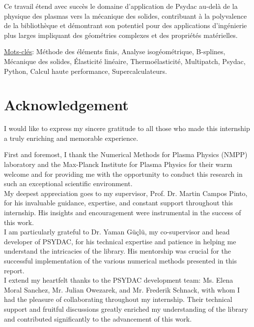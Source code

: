 \documentclass[a4paper,12pt,twoside]{report}
\begin{document}
Ce travail étend avec succès le domaine d'application de Psydac au-delà de la physique des plasmas vers la mécanique des solides, contribuant à la polyvalence de la bibliothèque et démontrant son potentiel pour des applications d'ingénierie plus larges impliquant des géométries complexes et des propriétés matérielles.

\vspace{0.4cm}

\underline{Mots-clés}: Méthode des éléments finis, Analyse isogéométrique, B-splines, Mécanique des solides, Élasticité linéaire, Thermoélasticité, Multipatch, Psydac, Python, Calcul haute performance, Supercalculateurs.

\newpage\null

\newpage

\section*{Acknowledgement}

I would like to express my sincere gratitude to all those who made this internship a truly enriching and memorable experience.

First and foremost, I thank the Numerical Methods for Plasma Physics (NMPP) laboratory and the Max-Planck Institute for Plasma Physics for their warm welcome and for providing me with the opportunity to conduct this research in such an exceptional scientific environment. \\

My deepest appreciation goes to my supervisor, Prof. Dr. Martin Campos Pinto, for his invaluable guidance, expertise, and constant support throughout this internship. His insights and encouragement were instrumental in the success of this work. \\

I am particularly grateful to Dr. Yaman Güçlü, my co-supervisor and head developer of PSYDAC, for his technical expertise and patience in helping me understand the intricacies of the library. His mentorship was crucial for the successful implementation of the various numerical methods presented in this report.\\

I extend my heartfelt thanks to the PSYDAC development team: Ms. Elena Moral Sanchez, Mr. Julian Owezarek, and Mr. Frederik Schnack, with whom I had the pleasure of collaborating throughout my internship. Their technical support and fruitful discussions greatly enriched my understanding of the library and contributed significantly to the advancement of this work. \\
\end{document}
